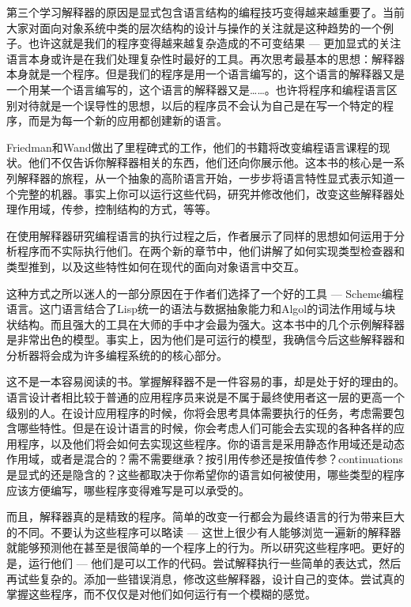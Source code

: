 第三个学习解释器的原因是显式包含语言结构的编程技巧变得越来越重要了。当前大家对面向对象系统中类的层次结构的设计与操作的关注就是这种趋势的一个例子。也许这就是我们的程序变得越来越复杂造成的不可变结果 --- 更加显式的关注语言本身或许是在我们处理复杂性时最好的工具。再次思考最基本的思想：解释器本身就是一个程序。但是我们的程序是用一个语言编写的，这个语言的解释器又是一个用某一个语言编写的，这个语言的解释器又是……。也许将程序和编程语言区别对待就是一个误导性的思想，以后的程序员不会认为自己是在写一个特定的程序，而是为每一个新的应用都创建新的语言。

Friedman和Wand做出了里程碑式的工作，他们的书籍将改变编程语言课程的现状。他们不仅告诉你解释器相关的东西，他们还向你展示他。这本书的核心是一系列解释器的旅程，从一个抽象的高阶语言开始，一步步将语言特性显式表示知道一个完整的机器。事实上你可以运行这些代码，研究并修改他们，改变这些解释器处理作用域，传参，控制结构的方式，等等。

在使用解释器研究编程语言的执行过程之后，作者展示了同样的思想如何运用于分析程序而不实际执行他们。在两个新的章节中，他们讲解了如何实现类型检查器和类型推到，以及这些特性如何在现代的面向对象语言中交互。

这种方式之所以迷人的一部分原因在于作者们选择了一个好的工具 --- Scheme编程语言。这门语言结合了Lisp统一的语法与数据抽象能力和Algol的词法作用域与块状结构。而且强大的工具在大师的手中才会最为强大。这本书中的几个示例解释器是非常出色的模型。事实上，因为他们是可运行的模型，我确信今后这些解释器和分析器将会成为许多编程系统的的核心部分。

这不是一本容易阅读的书。掌握解释器不是一件容易的事，却是处于好的理由的。语言设计者相比较于普通的应用程序员来说是不属于最终使用者这一层的更高一个级别的人。在设计应用程序的时候，你将会思考具体需要执行的任务，考虑需要包含哪些特性。但是在设计语言的时候，你会考虑人们可能会去实现的各种各样的应用程序，以及他们将会如何去实现这些程序。你的语言是采用静态作用域还是动态作用域，或者是混合的？需不需要继承？按引用传参还是按值传参？continuations是显式的还是隐含的？这些都取决于你希望你的语言如何被使用，哪些类型的程序应该方便编写，哪些程序变得难写是可以承受的。

而且，解释器真的是精致的程序。简单的改变一行都会为最终语言的行为带来巨大的不同。不要认为这些程序可以略读 --- 这世上很少有人能够浏览一遍新的解释器就能够预测他在甚至是很简单的一个程序上的行为。所以研究这些程序吧。更好的是，运行他们 --- 他们是可以工作的代码。尝试解释执行一些简单的表达式，然后再试些复杂的。添加一些错误消息，修改这些解释器，设计自己的变体。尝试真的掌握这些程序，而不仅仅是对他们如何运行有一个模糊的感觉。

